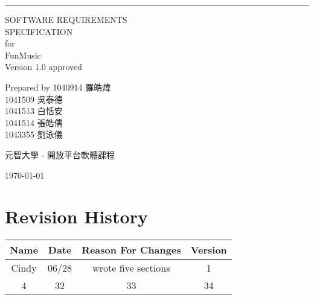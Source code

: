 \documentclass{scrreprt}
\date{}
\def\myversion{1.0 }
\begin{document}
\begin{flushright}
    \rule{16cm}{5pt}\vskip1cm
    \begin{bfseries}
        \Huge{SOFTWARE REQUIREMENTS\\ SPECIFICATION}\\
        \vspace{1.5cm}
        for\\
       \vspace{1.5cm}
        FunMusic\\
       \vspace{1.5cm}
        \LARGE{Version \myversion approved}\\
        \vspace{1.5cm}
        \begin{CJK}{UTF8}{<font>}
        Prepared by 1040914 羅皓煒\\
        1041509 吳泰德\\
        1041513 白恬安\\
        1041514 張皓儒\\ 
        1043355 劉泳儀\\
        \end{CJK}
       \vspace{1.5cm}
       \begin{CJK}{UTF8}{<font>}
       元智大學 - 開放平台軟體課程\\
        \end{CJK}
        \vspace{1.3cm}
        \today
    \end{bfseries}
\end{flushright}

\tableofcontents


\chapter*{Revision History}

\begin{center}
    \begin{tabular}{|c|c|c|c|}
        \hline
	    Name & Date & Reason For Changes & Version\\
        \hline
	    Cindy & 06/28 & wrote five sections & 1\\
        \hline
	    4 & 32 & 33 & 34\\
        \hline
    \end{tabular}
\end{center}
\end{document}
